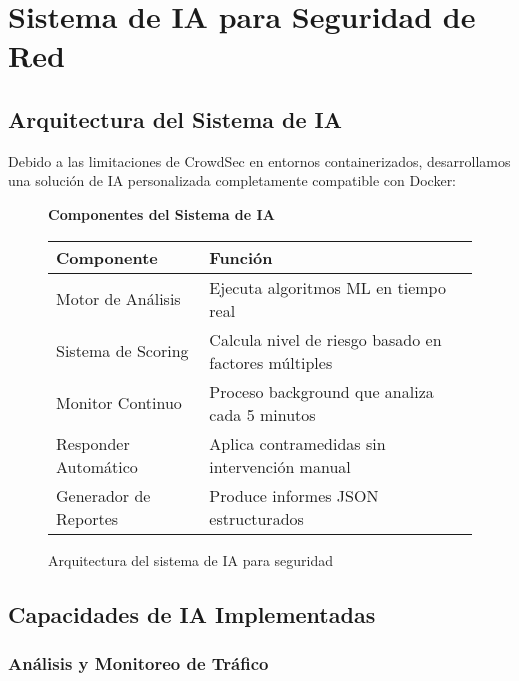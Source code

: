 \section{Sistema de IA para Seguridad de Red}

\subsection{Arquitectura del Sistema de IA}

Debido a las limitaciones de CrowdSec en entornos containerizados, desarrollamos una solución de IA personalizada completamente compatible con Docker:

\begin{figure}[H]
    \centering
    \begin{tcolorbox}[width=0.9\textwidth, colback=white, colframe=black, boxrule=1pt]
        \begin{center}
            \textbf{Componentes del Sistema de IA}\\[0.5cm]
            \begin{tabular}{|p{4cm}|p{8cm}|}
                \hline
                \textbf{Componente} & \textbf{Función} \\
                \hline
                Motor de Análisis & Ejecuta algoritmos ML en tiempo real \\
                Sistema de Scoring & Calcula nivel de riesgo basado en factores múltiples \\
                Monitor Continuo & Proceso background que analiza cada 5 minutos \\
                Responder Automático & Aplica contramedidas sin intervención manual \\
                Generador de Reportes & Produce informes JSON estructurados \\
                \hline
            \end{tabular}
        \end{center}
    \end{tcolorbox}
    \caption{Arquitectura del sistema de IA para seguridad}
    \label{fig:ia-arquitectura}
\end{figure}

\subsection{Capacidades de IA Implementadas}

\subsubsection{Análisis y Monitoreo de Tráfico}

